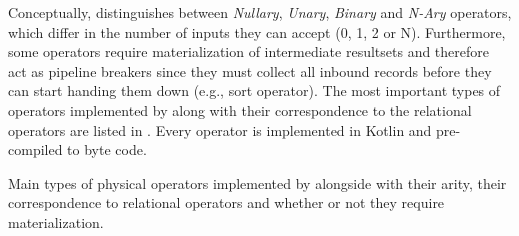 Conceptually, \cottontail{} distinguishes between \emph{Nullary}, \emph{Unary}, \emph{Binary} and \emph{N-Ary} operators, which differ in the number of inputs they can accept (0, 1, 2 or N). Furthermore, some operators require materialization of intermediate resultsets and therefore act as pipeline breakers since they must collect all inbound records before they can start handing them down (e.g., sort operator). The most important types of operators implemented by \cottontail{} along with their correspondence to the relational operators are listed in . Every operator is implemented in Kotlin and pre-compiled to byte code.

\begin{table}
    \caption{Main types of physical operators implemented by \cottontail{} alongside with their arity, their correspondence to relational operators and whether or not they require materialization.}
    \label{table:cottontail_operators}


\end{table}
